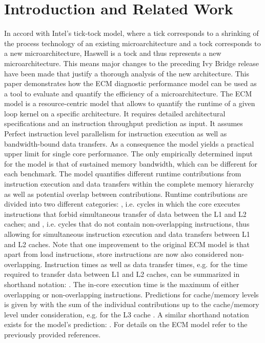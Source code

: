 \documentclass{llncs}
\newcommand{\ecmshort}[5]{\mbox{}}
\newcommand{\ecmpshort}[4]{\mbox{}}
\begin{document}
\section{Introduction and Related Work}
In accord with Intel's tick-tock model, where a tick corresponds to a shrinking
of the process technology of an existing microarchitecture and a tock
corresponds to a new microarchitecture, Haswell is a tock and thus represents a
new microarchitecture. This means major changes to the preceding Ivy Bridge
release have been made that justify a thorough analysis of the new
architecture. This paper demonstrates how the \ac{ECM} diagnostic performance
model \cite{Hofmann:2015:1,Treibig:2009,hager:cpe,sthw15} can be used as a tool
to evaluate and quantify the efficiency of a microarchitecture.
The ECM model is a resource-centric model that allows to quantify the runtime
of a given loop kernel on a specific architecture. It requires detailed
architectural specifications and an instruction throughput prediction as input.
It assumes Perfect instruction level parallelism for instruction execution as
well as bandwidth-bound data transfers. As a consequence the model yields a
practical upper limit for single core performance. The only empirically
determined input for the model is that of sustained memory bandwidth, which can
be different for each benchmark.  The model quantifies different runtime
contributions from instruction execution and data transfers within the complete
memory hierarchy as well as potential overlap between contributions. Runtime
contributions are divided into two different categories: , i.e.
cycles in which the core executes instructions that forbid simultaneous
transfer of data between the L1 and L2 caches; and , i.e. cycles
that do not contain non-overlapping instructions, thus allowing for
simultaneous instruction execution and data transfers between L1 and L2 caches.
Note that one improvement to the original \ac{ECM} model is that apart from
load instructions, store instructions are now also considered non-overlapping.
Instruction times as well as data transfer times, e.g. 
for the time required to transfer data between L1 and L2 caches, can be
summarized in shorthand notation:
\ecmshort{T_\mathrm{OL}}{T_\mathrm{nOL}}{T_\mathrm{L1L2}}{T_\mathrm{L2L3}}{T_\mathrm{L3Mem}}.
The in-core execution time  is the maximum of either
overlapping or non-overlapping instructions. Predictions for cache/memory
levels is given by  with
 the sum of the individual contributions up to the
cache/memory level under consideration, e.g. for the L3 cache
. A similar shorthand notation
exists for the model's prediction:
\ecmpshort{T_\mathrm{core}}{T_\mathrm{L2}}{T_\mathrm{L3}}{T_\mathrm{Mem}}{}.
For details on the ECM model refer to the previously provided references.
\end{document}

